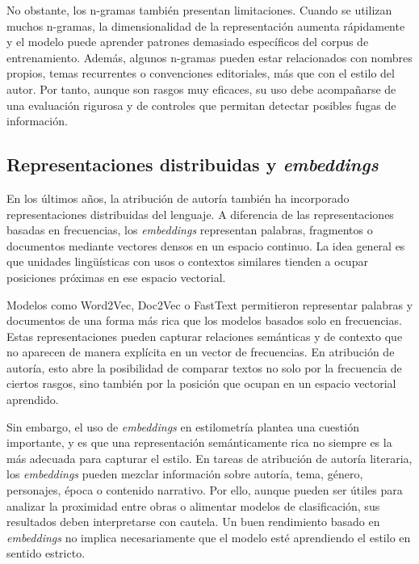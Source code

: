 \documentclass[IB]{TFUOC}%
\begin{document}
No obstante, los n-gramas también presentan limitaciones. Cuando se utilizan muchos n-gramas, la dimensionalidad de la representación aumenta rápidamente y el modelo puede aprender patrones demasiado específicos del corpus de entrenamiento. Además, algunos n-gramas pueden estar relacionados con nombres propios, temas recurrentes o convenciones editoriales, más que con el estilo del autor. Por tanto, aunque son rasgos muy eficaces, su uso debe acompañarse de una evaluación rigurosa y de controles que permitan detectar posibles fugas de información.

\subsection{Representaciones distribuidas y \textit{embeddings}}

En los últimos años, la atribución de autoría también ha incorporado representaciones distribuidas del lenguaje. A diferencia de las representaciones basadas en frecuencias, los \textit{embeddings} representan palabras, fragmentos o documentos mediante vectores densos en un espacio continuo. La idea general es que unidades lingüísticas con usos o contextos similares tienden a ocupar posiciones próximas en ese espacio vectorial.

Modelos como Word2Vec\cite{mikolov2013efficient}, Doc2Vec\cite{le2014distributed} o FastText\cite{bojanowski2017enriching} permitieron representar palabras y documentos de una forma más rica que los modelos basados solo en frecuencias. Estas representaciones pueden capturar relaciones semánticas y de contexto que no aparecen de manera explícita en un vector de frecuencias. En atribución de autoría, esto abre la posibilidad de comparar textos no solo por la frecuencia de ciertos rasgos, sino también por la posición que ocupan en un espacio vectorial aprendido.

Sin embargo, el uso de \textit{embeddings} en estilometría plantea una cuestión importante, y es que una representación semánticamente rica no siempre es la más adecuada para capturar el estilo. En tareas de atribución de autoría literaria, los \textit{embeddings} pueden mezclar información sobre autoría, tema, género, personajes, época o contenido narrativo. Por ello, aunque pueden ser útiles para analizar la proximidad entre obras o alimentar modelos de clasificación, sus resultados deben interpretarse con cautela. Un buen rendimiento basado en \textit{embeddings} no implica necesariamente que el modelo esté aprendiendo el estilo en sentido estricto.
\end{document}
